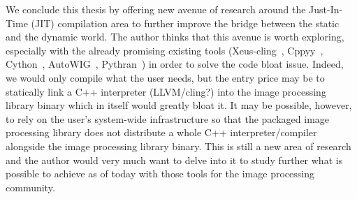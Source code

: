 We conclude this thesis by offering new avenue of research around the Just-In-Time (JIT) compilation area to further
improve the bridge between the static and the dynamic world. The author thinks that this avenue is worth exploring,
especially with the already promising existing tools (Xeus-cling~\parencite{quantstack.2021.xeus-cling},
Cppyy~\parencite{wimtlplavrijsen.2016.cppyy}, Cython~\parencite{behnel.2010.cython},
AutoWIG~\parencite{fernique.2018.autowig}, Pythran~\parencite{guelton.2015.pythran}) in order to solve the code bloat
issue. Indeed, we would only compile what the user needs, but the entry price may be to statically link a C++
interpreter (LLVM/cling?) into the image processing library binary which in itself would greatly bloat it. It may be
possible, however, to rely on the user's system-wide infrastructure so that the packaged image processing library does
not distribute a whole C++ interpreter/compiler alongside the image processing library binary. This is still a new area
of research and the author would very much want to delve into it to study further what is possible to achieve as of
today with those tools for the image processing community.





